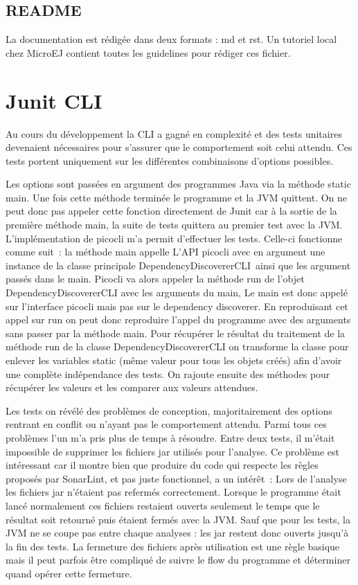 \documentclass[french,a4paper,12pt]{report}
\begin{document}
\subsection{README}

La documentation est rédigée dans deux formats : md et rst. Un tutoriel local chez MicroEJ contient toutes les guidelines pour rédiger ces fichier.

\section{Junit CLI}

Au cours du développement la CLI a gagné en complexité et des tests unitaires devenaient nécessaires pour s’assurer que le comportement soit celui attendu. Ces tests portent uniquement sur les différentes combinaisons d’options possibles. 

Les options sont passées en argument des programmes Java via la méthode static main. Une fois cette méthode terminée le programme et la JVM quittent. On ne peut donc pas appeler cette fonction directement de Junit car à la sortie de la première méthode main, la suite de tests quittera au premier test avec la JVM. 
L’implémentation de picocli m’a permit d’effectuer les tests. Celle-ci fonctionne comme suit : la méthode main appelle L’API picocli avec en argument une instance de la classe principale DependencyDiscovererCLI ainsi que les argument passés dans le main.
Picocli va alors appeler la méthode run de l'objet DependencyDiscovererCLI avec les arguments du main, Le main est donc appelé sur l'interface picocli mais pas sur le dependency discoverer.
En reproduisant cet appel sur run on peut donc reproduire l’appel du programme avec des arguments sans passer par la méthode main.
Pour récupérer le résultat du traitement de la méthode run de la classe DependencyDiscovererCLI on transforme la classe pour enlever les variables static (même valeur pour tous les objets créés) afin d’avoir une complète indépendance des tests. On rajoute ensuite des méthodes pour récupérer les valeurs et les comparer aux valeurs attendues.

Les tests on révélé des problèmes de conception, majoritairement des options rentrant en conflit ou n’ayant pas le comportement attendu. Parmi tous ces problèmes l'un m’a pris plus de temps à résoudre. Entre deux tests, il m’était impossible de supprimer les fichiers jar utilisés pour l’analyse. Ce problème est intéressant car il montre bien que produire du code qui respecte les règles proposés par SonarLint,  et pas juste fonctionnel, a un intérêt : 
Lors de l'analyse les fichiers jar n'étaient pas refermés correctement. Lorsque le programme était lancé normalement ces fichiers restaient ouverts seulement le temps que le résultat soit retourné puis étaient fermés avec la JVM. Sauf que pour les tests, la JVM ne se coupe pas entre chaque analyses : les jar restent donc ouverts jusqu’à la fin des tests. 
La fermeture des fichiers après utilisation est une règle basique mais il peut parfois être compliqué de suivre le flow du programme et déterminer quand opérer cette fermeture.
\end{document}
